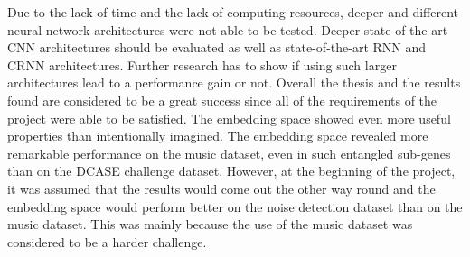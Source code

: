 \newline
Due to the lack of time and the lack of computing resources, deeper and different neural network architectures were not able to be tested. Deeper state-of-the-art \gls{CNN} architectures should be evaluated as well as state-of-the-art \gls{RNN} and \gls{CRNN} architectures. Further research has to show if using such larger architectures lead to a performance gain or not.
\newline
\newline
Overall the thesis and the results found are considered to be a great success since all of the requirements of the project were able to be satisfied. The embedding space showed even more useful properties than intentionally imagined. The embedding space revealed more remarkable performance on the music dataset, even in such entangled sub-genes than on the \gls{DCASE} challenge dataset. However, at the beginning of the project, it was assumed that the results would come out the other way round and the embedding space would perform better on the noise detection dataset than on the music dataset. This was mainly because the use of the music dataset was considered to be a harder challenge.

